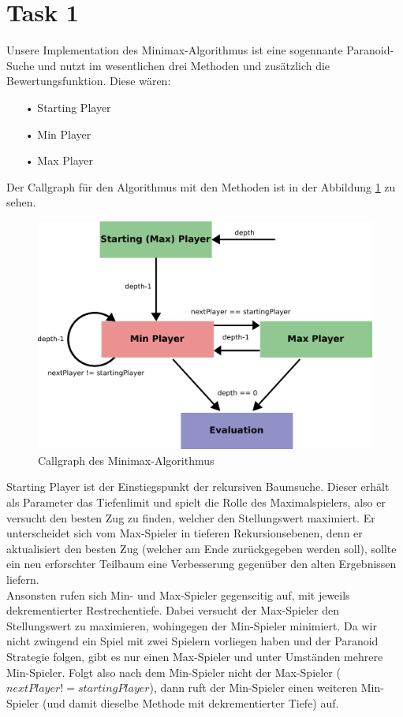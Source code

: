 \section{Task 1}
Unsere Implementation des Minimax-Algorithmus ist eine sogennante Paranoid-Suche und nutzt im wesentlichen drei Methoden und zusätzlich die Bewertungsfunktion. Diese wären:
\begin{enumerate}
\item[•]Starting Player
\item[•]Min Player
\item[•]Max Player
\end{enumerate}
Der Callgraph für den Algorithmus mit den Methoden ist in der Abbildung \ref{fig::callgraph-minimax} zu sehen.
\begin{figure}[h]
	\begin{center}
		\includegraphics[scale=0.25]{MinMaxCallGraph.pdf}
		\caption{Callgraph des Minimax-Algorithmus}
		\label{fig::callgraph-minimax}
	\end{center}
\end{figure}
Starting Player ist der Einstiegspunkt der rekursiven Baumsuche. Dieser erhält als Parameter das Tiefenlimit und spielt die Rolle des Maximalspielers, also er versucht den besten Zug zu finden, welcher den Stellungswert maximiert. Er unterscheidet sich vom Max-Spieler in tieferen Rekursionsebenen, denn er aktualisiert den besten Zug (welcher am Ende zurückgegeben werden soll), sollte ein neu erforschter Teilbaum eine Verbesserung gegenüber den alten Ergebnissen liefern.\\
Ansonsten rufen sich Min- und Max-Spieler gegenseitig auf, mit jeweils dekrementierter Restrechentiefe. Dabei versucht der Max-Spieler den Stellungswert zu maximieren, wohingegen der Min-Spieler minimiert. Da wir nicht zwingend ein Spiel mit zwei Spielern vorliegen haben und der Paranoid Strategie folgen, gibt es nur einen Max-Spieler und unter Umständen mehrere Min-Spieler. Folgt also nach dem Min-Spieler nicht der Max-Spieler ($nextPlayer != startingPlayer$), dann ruft der Min-Spieler einen weiteren Min-Spieler (und damit dieselbe Methode mit dekrementierter Tiefe) auf.\\
